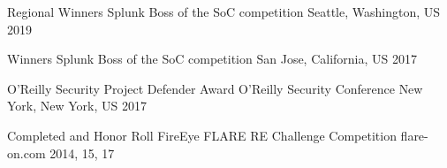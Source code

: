

\begin{cvhonors}


\cvhonor
{Regional Winners} %
{Splunk Boss of the SoC competition} %
{Seattle, Washington, US} %
{2019} %

\cvhonor
{Winners} %
{Splunk Boss of the SoC competition} %
{San Jose, California, US} %
{2017} %


\cvhonor
{O'Reilly Security Project Defender Award} %
{O'Reilly Security Conference} %
{New York, New York, US} %
{2017} %


\cvhonor
{Completed and Honor Roll} %
{FireEye FLARE RE Challenge Competition} %
{flare-on.com} %
{2014, 15, 17} %


\end{cvhonors}
